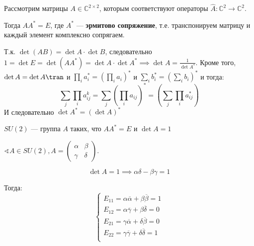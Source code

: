 Рассмотрим матрицы \(A \in \mathbb{C}^{2\times 2}\), которым соответствуют операторы \(\hat{A} : \mathbb{C}^2 \to \mathbb{C}^2\).

Тогда \(A A^* = E\), где \(A^*\) --- \textbf{эрмитово сопряжение},
т.е. транспонируем матрицу и каждый элемент комплексно сопрягаем.

Т.к. \(\det (A B) = \det A \cdot \det B\), следовательно
\(1 = \det E = \det (A A^*) = \det A \cdot \det A^* \implies \det A = \frac{1}{\det A^*}\).
Кроме того, \(\det A = \det A\tran\) и \(\prod_i a_i^* = \left( \prod_i a_i \right)^*\) и \(\sum_i b_i^* = \left( \sum_i b_i \right)^*\) и тогда:
\[\sum_j \prod_i a_{ij}^k = \sum_j \left( \prod_i a_{ij} \right)^* = \left( \sum_j \prod_i a_{ij}^* \right)\]
И следовательно \(\det A^* = (\det A)^*\)

\begin{definition}
	\(SU(2)\) --- группа \(A\) таких, что \(A A^* = E\) и \(\det A = 1\)
\end{definition}

\(\sphericalangle A \in SU(2), A = \begin{pmatrix} \alpha & \beta \\ \gamma & \delta \end{pmatrix}\).

\[\det A = 1 \implies \alpha \delta - \beta \gamma = 1\]

Тогда:
\[\begin{cases}
		E_{11} = \alpha \overline{\alpha} + \beta \overline{\beta} = 1   \\
		E_{12} = \alpha \overline{\gamma} + \beta \overline{\delta} = 0  \\
		E_{21} = \gamma \overline{\alpha} + \delta \overline{\beta} = 0  \\
		E_{22} = \gamma \overline{\gamma} + \delta \overline{\delta} = 1 \\
	\end{cases}\]

